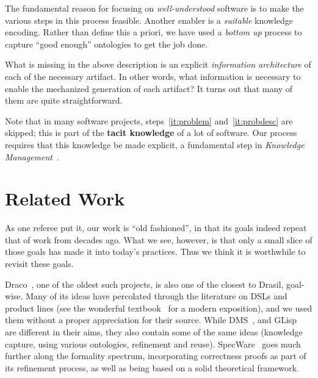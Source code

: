 \documentclass[a4paper,UKenglish,cleveref,autoref,thm-restate]{oasics-v2021}
\begin{document}
The fundamental reason for focusing on \emph{well-understood} software is to
make the various steps in this process feasible. Another enabler is a
\emph{suitable} knowledge encoding. Rather than define this a priori, we have
used a \emph{bottom up} process to capture ``good enough'' ontologies to get the
job done.

What is missing in the above description is an explicit \emph{information
architecture} of each of the necessary artifact. In other words, what
information is necessary to enable the mechanized generation of each artifact?
It turns out that many of them are quite straightforward.

Note that in many software projects, steps~\ref{it:problem}
and~\ref{it:probdesc} are skipped; this is part of the \textbf{tacit knowledge}
of a lot of software.  Our process requires that this knowledge be made
explicit, a fundamental step in \emph{Knowledge Management}~\cite{Dalkir2011}.


\section{Related Work}\label{sec:relwork}

As one referee put it, our work is ``old fashioned'', in that its goals
indeed repeat that of work from decades ago. What we see, however, is
that only a small slice of those goals has made it into today's
practices. Thus we think it is worthwhile to revisit these goals.

Draco~\cite{neighbors1984draco,neighbors1989draco}, one of the oldest
such projects, is also one of the closest to Drasil, goal-wise. Many of
its ideas have percolated through the literature on DSLs and product
lines (see the wonderful textbook~\cite{apel2016feature} for a modern
exposition), and we used them without a proper appreciation for their
source. While DMS~\cite{baxter1992design,baxter2002dms}, and
GLisp~\cite{novak1983glisp,novak1994generating} are different in their
aims, they also contain some of the same ideas (knowledge capture,
using various ontologies, refinement and reuse).
SpecWare~\cite{srinivas95specware,smith1999mechanizing} goes much
further along the formality spectrum, incorporating correctness proofs
as part of its refinement process, as well as being based on a solid
theoretical framework.

\end{document}
